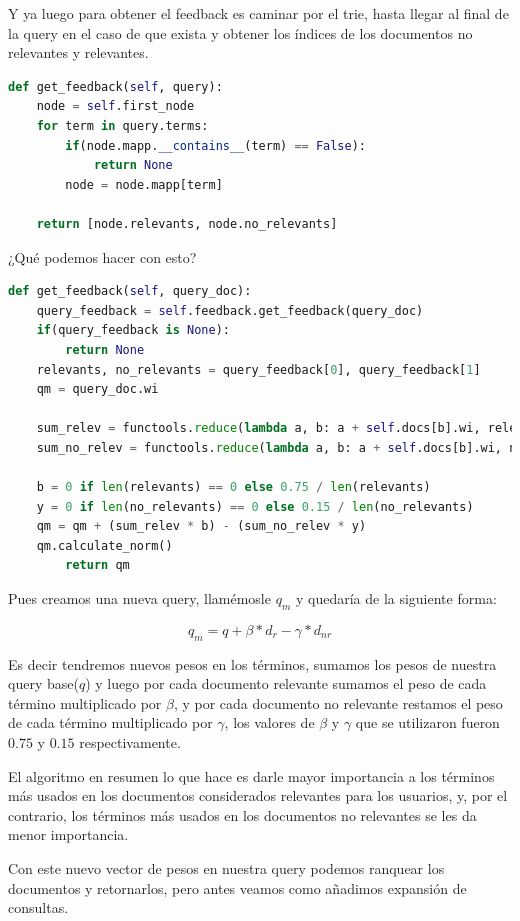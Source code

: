 \documentclass{llncs}
\begin{document}
Y ya luego para obtener el feedback es caminar por el trie, hasta llegar al final de la query en el caso de que exista y obtener los índices de los documentos no relevantes y relevantes.

\begin{lstlisting}[language=Python]
def get_feedback(self, query):
    node = self.first_node
    for term in query.terms:
        if(node.mapp.__contains__(term) == False):
            return None
        node = node.mapp[term]

    return [node.relevants, node.no_relevants]
\end{lstlisting}

¿Qué podemos hacer con esto?

\begin{lstlisting}[language=Python]
def get_feedback(self, query_doc):
    query_feedback = self.feedback.get_feedback(query_doc)
    if(query_feedback is None):
        return None
    relevants, no_relevants = query_feedback[0], query_feedback[1]
    qm = query_doc.wi

    sum_relev = functools.reduce(lambda a, b: a + self.docs[b].wi, relevants, Vector())
    sum_no_relev = functools.reduce(lambda a, b: a + self.docs[b].wi, no_relevants, Vector())

    b = 0 if len(relevants) == 0 else 0.75 / len(relevants)
    y = 0 if len(no_relevants) == 0 else 0.15 / len(no_relevants)
    qm = qm + (sum_relev * b) - (sum_no_relev * y)
    qm.calculate_norm()
        return qm
\end{lstlisting}

Pues creamos una nueva query, llamémosle $q_m$ y quedaría de la siguiente forma:


$$ q_m = q + \beta * d_r - \gamma * d_{nr} $$


Es decir tendremos nuevos pesos en los términos, sumamos los pesos de nuestra query base($q$) y luego por cada documento relevante sumamos el peso de cada término multiplicado por $\beta$, y por cada documento no relevante restamos el peso de cada término multiplicado por $\gamma$, los valores de $\beta$ y $\gamma$ que se utilizaron fueron $0.75$ y $0.15$ respectivamente.


El algoritmo en resumen lo que hace es darle mayor importancia a los términos más usados en los documentos considerados relevantes para los usuarios, y, por el contrario, los términos más usados en los documentos no relevantes se les da menor importancia.


Con este nuevo vector de pesos en nuestra query podemos ranquear los documentos y retornarlos, pero antes veamos como añadimos expansión de consultas.
\end{document}
